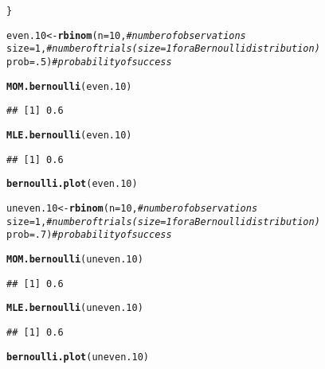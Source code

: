 \documentclass{article}\usepackage[]{graphicx}\usepackage[]{color}
\makeatletter
\newcommand{\hlnum}[1]{\textcolor[rgb]{0.686,0.059,0.569}{#1}}%
\newcommand{\hlcom}[1]{\textcolor[rgb]{0.678,0.584,0.686}{\textit{#1}}}%
\newcommand{\hlstd}[1]{\textcolor[rgb]{0.345,0.345,0.345}{#1}}%
\newcommand{\hlkwb}[1]{\textcolor[rgb]{0.69,0.353,0.396}{#1}}%
\newcommand{\hlkwc}[1]{\textcolor[rgb]{0.333,0.667,0.333}{#1}}%
\newcommand{\hlkwd}[1]{\textcolor[rgb]{0.737,0.353,0.396}{\textbf{#1}}}%
\newenvironment{kframe}{%
 \def\at@end@of@kframe{}%
 \ifinner\ifhmode%
  \def\at@end@of@kframe{\end{minipage}}%
  \begin{minipage}{\columnwidth}%
 \fi\fi%
 \def\FrameCommand##1{\hskip\@totalleftmargin \hskip-\fboxsep
 \colorbox{shadecolor}{##1}\hskip-\fboxsep
     \hskip-\linewidth \hskip-\@totalleftmargin \hskip\columnwidth}%
 \MakeFramed {\advance\hsize-\width
   \@totalleftmargin\z@ \linewidth\hsize
   \@setminipage}}%
 {\par\unskip\endMakeFramed%
 \at@end@of@kframe}
\newenvironment{knitrout}{}{} %
\makeatother
\begin{document}
\begin{enumerate}
\begin{enumerate}
\begin{knitrout}
\begin{kframe}
\begin{alltt}
\hlstd{\}}


\hlstd{even.10} \hlkwb{<-} \hlkwd{rbinom}\hlstd{(}\hlkwc{n}\hlstd{=}\hlnum{10}\hlstd{,}        \hlcom{#number of observations}
                    \hlkwc{size}\hlstd{=}\hlnum{1}\hlstd{,}        \hlcom{#number of trials (size=1 for a Bernoulli distribution)}
                    \hlkwc{prob}\hlstd{=}\hlnum{.5}\hlstd{)}       \hlcom{#probability of success}

\hlkwd{MOM.bernoulli}\hlstd{(even.10)}
\end{alltt}
\begin{verbatim}
## [1] 0.6
\end{verbatim}
\begin{alltt}
\hlkwd{MLE.bernoulli}\hlstd{(even.10)}
\end{alltt}
\begin{verbatim}
## [1] 0.6
\end{verbatim}
\begin{alltt}
\hlkwd{bernoulli.plot}\hlstd{(even.10)}
\end{alltt}


{\ttfamily\noindent\bfseries\color{errorcolor}{\#\# Error: Can't add `p2` to a ggplot object.}}\begin{alltt}
\hlstd{uneven.10} \hlkwb{<-} \hlkwd{rbinom}\hlstd{(}\hlkwc{n}\hlstd{=}\hlnum{10}\hlstd{,}        \hlcom{#number of observations}
                    \hlkwc{size}\hlstd{=}\hlnum{1}\hlstd{,}        \hlcom{#number of trials (size=1 for a Bernoulli distribution)}
                    \hlkwc{prob}\hlstd{=}\hlnum{.7}\hlstd{)}       \hlcom{#probability of success}

\hlkwd{MOM.bernoulli}\hlstd{(uneven.10)}
\end{alltt}
\begin{verbatim}
## [1] 0.6
\end{verbatim}
\begin{alltt}
\hlkwd{MLE.bernoulli}\hlstd{(uneven.10)}
\end{alltt}
\begin{verbatim}
## [1] 0.6
\end{verbatim}
\begin{alltt}
\hlkwd{bernoulli.plot}\hlstd{(uneven.10)}
\end{alltt}



\end{kframe}
\end{knitrout}
\end{enumerate}
\end{enumerate}
\end{document}
